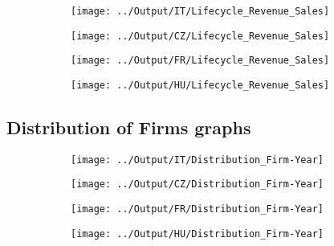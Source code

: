 \documentclass[12pt,notitlepage]{article}
\begin{document}
\begin{figure}[!htpb]
\centering
\caption{Firm age and Revenue/Sales}
\begin{subfigure}{.49\textwidth}
    \centering
 \texttt{[image: ../Output/IT/Lifecycle\_Revenue\_Sales]}
\end{subfigure}%
\begin{subfigure}{.49\textwidth}
    \centering
 \texttt{[image: ../Output/CZ/Lifecycle\_Revenue\_Sales]}
\end{subfigure}
\begin{subfigure}{.49\textwidth}
    \centering
 \texttt{[image: ../Output/FR/Lifecycle\_Revenue\_Sales]}
\end{subfigure}%
\begin{subfigure}{.49\textwidth}
    \centering
 \texttt{[image: ../Output/HU/Lifecycle\_Revenue\_Sales]}
\end{subfigure}
\end{figure}
\pagebreak

\subsection*{Distribution of Firms graphs}

\begin{figure}[!htpb]
\centering
\caption{Distribution of firms across years}
\begin{subfigure}{.49\textwidth}
    \centering
 \texttt{[image: ../Output/IT/Distribution\_Firm-Year]}
\end{subfigure}%
\begin{subfigure}{.49\textwidth}
    \centering
 \texttt{[image: ../Output/CZ/Distribution\_Firm-Year]}
\end{subfigure}
\begin{subfigure}{.49\textwidth}
    \centering
 \texttt{[image: ../Output/FR/Distribution\_Firm-Year]}
\end{subfigure}%
\begin{subfigure}{.49\textwidth}
    \centering
 \texttt{[image: ../Output/HU/Distribution\_Firm-Year]}
\end{subfigure}
\end{figure}
\pagebreak
\end{document}
